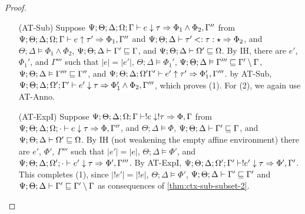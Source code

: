 \begin{proof}
\begin{itemize}
  \item[(AT-Sub)] Suppose 
    $\Psi ; \Theta ; \Delta ; \Omega ; \Gamma \vdash e \downarrow \tau \Rightarrow \Phi_1 \wedge \Phi_2,\Gamma''$ from
   $\Psi ; \Theta ; \Delta ; \Omega ; \Gamma \vdash e \uparrow \tau' \Rightarrow \Phi_1,\Gamma''$ and 
   $\Psi;\Theta;\Delta \vdash \tau' <: \tau : \star \Rightarrow \Phi_2$, and
   $\Theta ; \Delta \vDash \Phi_1 \wedge \Phi_2$,
   $\Psi ; \Theta ; \Delta \vdash \Gamma' \sqsubseteq \Gamma$, and
   $\Psi ; \Theta ; \Delta \vdash \Omega' \sqsubseteq \Omega$.
   By IH, there are $e'$,$\Phi_1'$, and $\Gamma'''$ such that
   $|e| = |e'|$,
   $\Theta ; \Delta \vDash \Phi_1'$,
   $\Psi ; \Theta ; \Delta \vDash \Gamma''' \sqsubseteq \Gamma' \setminus \Gamma$,
   $\Psi ; \Theta ; \Delta \vDash \Gamma''' \sqsubseteq \Gamma''$,
   and $\Psi ; \Theta ; \Delta ; \Omega' \Gamma' \vdash e' \uparrow \tau' \Rightarrow \Phi_1',\Gamma'''$.
   by AT-Sub, $\Psi ; \Theta ; \Delta ; \Omega' ; \Gamma' \vdash e' \downarrow \tau \Rightarrow \Phi_1' \wedge \Phi_2,\Gamma'''$, which proves (1).
   For (2), we again use AT-Anno.
   
  \item[(AT-ExpI)] Suppose $\Psi ; \Theta ; \Delta ; \Omega ; \Gamma \vdash !e \downarrow !\tau \Rightarrow \Phi, \Gamma$ from
  $\Psi ; \Theta ; \Delta ; \Omega ; \cdot \vdash e \downarrow \tau \Rightarrow \Phi, \Gamma''$, and
  $\Theta ; \Delta \vDash \Phi$,
  $\Psi ; \Theta ; \Delta \vdash \Gamma' \sqsubseteq \Gamma$, and
  $\Psi ; \Theta ; \Delta \vdash \Omega' \sqsubseteq \Omega$.
  By IH (not weakening the empty affine environment) there are $e'$, $\Phi'$, $\Gamma'''$ such that 
  $|e'| = |e|$,
  $\Theta ; \Delta \vDash \Phi'$,
  and  $\Psi ; \Theta ; \Delta ; \Omega' ; \cdot \vdash e' \downarrow \tau \Rightarrow \Phi',\Gamma'''$.
  By AT-ExpI,
  $\Psi ; \Theta ; \Delta ; \Omega' ; \Gamma' \vdash !e' \downarrow \tau \Rightarrow \Phi',\Gamma'$.
  This completes (1), since $|!e'| = |!e|$, $\Theta ; \Delta \vDash \Phi'$,
  $\Psi ; \Theta ; \Delta \vdash \Gamma' \sqsubseteq \Gamma'$ and $\Psi ; \Theta ; \Delta \vdash \Gamma' \sqsubseteq \Gamma' \setminus \Gamma$
  as consequences of \autoref{thm:ctx-sub-subset-2}.
  

\end{itemize}
\end{proof}

